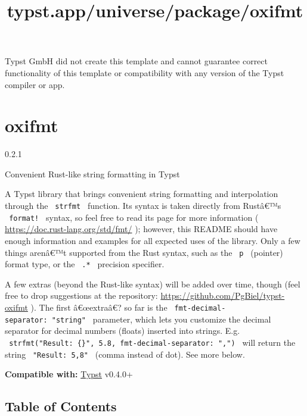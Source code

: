 Typst GmbH did not create this template and cannot guarantee correct
functionality of this template or compatibility with any version of the
Typst compiler or app.


\title{typst.app/universe/package/oxifmt}

\label{banner}
\section{oxifmt}\label{oxifmt}

{ 0.2.1 }

Convenient Rust-like string formatting in Typst

\label{readme}
A Typst library that brings convenient string formatting and
interpolation through the \texttt{\ strfmt\ } function. Its syntax is
taken directly from Rustâ€™s \texttt{\ format!\ } syntax, so feel free
to read its page for more information (
\url{https://doc.rust-lang.org/std/fmt/} ); however, this README should
have enough information and examples for all expected uses of the
library. Only a few things arenâ€™t supported from the Rust syntax, such
as the \texttt{\ p\ } (pointer) format type, or the \texttt{\ .*\ }
precision specifier.

A few extras (beyond the Rust-like syntax) will be added over time,
though (feel free to drop suggestions at the repository:
\url{https://github.com/PgBiel/typst-oxifmt} ). The first â€œextraâ€? so
far is the \texttt{\ fmt-decimal-separator:\ "string"\ } parameter,
which lets you customize the decimal separator for decimal numbers
(floats) inserted into strings. E.g.
\texttt{\ strfmt("Result:\ \{\}",\ 5.8,\ fmt-decimal-separator:\ ",")\ }
will return the string \texttt{\ "Result:\ 5,8"\ } (comma instead of
dot). See more below.

\textbf{Compatible with:} \href{https://github.com/typst/typst}{Typst}
v0.4.0+

\subsection{Table of Contents}\label{table-of-contents}

